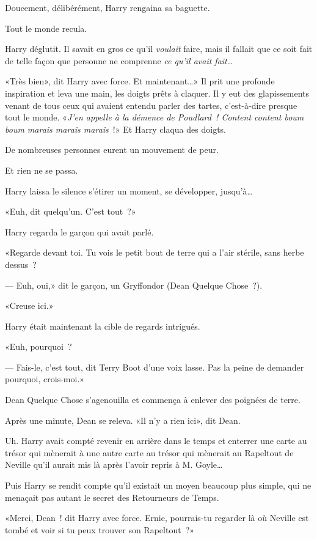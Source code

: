 Doucement, délibérément, Harry rengaina sa baguette.

Tout le monde recula.

Harry déglutit. Il savait en gros ce qu'il \emph{voulait} faire, mais il fallait que ce soit fait de telle façon que personne ne comprenne \emph{ce qu'il avait fait}…

«Très bien», dit Harry avec force. Et maintenant…» Il prit une profonde inspiration et leva une main, les doigts prêts à claquer. Il y eut des glapissements venant de tous ceux qui avaient entendu parler des tartes, c'est-à-dire presque tout le monde. «\emph{J'en appelle à la démence de Poudlard~! Content content boum boum marais marais marais}~!» Et Harry claqua des doigts.

De nombreuses personnes eurent un mouvement de peur.

Et rien ne se passa.

Harry laissa le silence s'étirer un moment, se développer, jusqu'à…

«Euh, dit quelqu'un. C'est tout~?»

Harry regarda le garçon qui avait parlé.

«Regarde devant toi. Tu vois le petit bout de terre qui a l'air stérile, sans herbe dessus~?

--- Euh, oui,» dit le garçon, un Gryffondor (Dean Quelque Chose~?).

«Creuse ici.»

Harry était maintenant la cible de regards intrigués.

«Euh, pourquoi~?

--- Fais-le, c'est tout, dit Terry Boot d'une voix lasse. Pas la peine de demander pourquoi, crois-moi.»

Dean Quelque Chose s'agenouilla et commença à enlever des poignées de terre.

Après une minute, Dean se releva. «Il n'y a rien ici», dit Dean.

Uh. Harry avait compté revenir en arrière dans le temps et enterrer une carte au trésor qui mènerait à une autre carte au trésor qui mènerait au Rapeltout de Neville qu'il aurait mis là après l'avoir repris à M. Goyle…

Puis Harry se rendit compte qu'il existait un moyen beaucoup plus simple, qui ne menaçait pas autant le secret des Retourneurs de Temps.

«Merci, Dean~! dit Harry avec force. Ernie, pourrais-tu regarder là où Neville est tombé et voir si tu peux trouver son Rapeltout~?»

